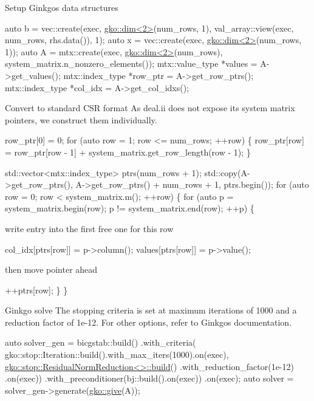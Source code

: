 Setup Ginkgo\textquotesingle{}s data structures


\begin{DoxyCode}
\textcolor{keyword}{auto} b = vec::create(exec, \hyperlink{structgko_1_1dim}{gko::dim<2>}(num\_rows, 1),
                     val\_array::view(exec, num\_rows, rhs.data()), 1);
\textcolor{keyword}{auto} x = vec::create(exec, \hyperlink{structgko_1_1dim}{gko::dim<2>}(num\_rows, 1));
\textcolor{keyword}{auto} A = mtx::create(exec, \hyperlink{structgko_1_1dim}{gko::dim<2>}(num\_rows),
                     system\_matrix.n\_nonzero\_elements());
mtx::value\_type *values = A->get\_values();
mtx::index\_type *row\_ptr = A->get\_row\_ptrs();
mtx::index\_type *col\_idx = A->get\_col\_idxs();
\end{DoxyCode}


Convert to standard C\+SR format As deal.\+ii does not expose its system matrix pointers, we construct them individually.


\begin{DoxyCode}
row\_ptr[0] = 0;
\textcolor{keywordflow}{for} (\textcolor{keyword}{auto} row = 1; row <= num\_rows; ++row) \{
    row\_ptr[row] = row\_ptr[row - 1] + system\_matrix.get\_row\_length(row - 1);
\}

std::vector<mtx::index\_type> ptrs(num\_rows + 1);
std::copy(A->get\_row\_ptrs(), A->get\_row\_ptrs() + num\_rows + 1,
          ptrs.begin());
\textcolor{keywordflow}{for} (\textcolor{keyword}{auto} row = 0; row < system\_matrix.m(); ++row) \{
    \textcolor{keywordflow}{for} (\textcolor{keyword}{auto} p = system\_matrix.begin(row); p != system\_matrix.end(row);
         ++p) \{
\end{DoxyCode}


write entry into the first free one for this row


\begin{DoxyCode}
col\_idx[ptrs[row]] = p->column();
values[ptrs[row]] = p->value();
\end{DoxyCode}


then move pointer ahead


\begin{DoxyCode}
        ++ptrs[row];
    \}
\}
\end{DoxyCode}


Ginkgo solve The stopping criteria is set at maximum iterations of 1000 and a reduction factor of 1e-\/12. For other options, refer to Ginkgo\textquotesingle{}s documentation.


\begin{DoxyCode}
\textcolor{keyword}{auto} solver\_gen =
    bicgstab::build()
        .with\_criteria(
            gko::stop::Iteration::build().with\_max\_iters(1000).on(exec),
            \hyperlink{classgko_1_1stop_1_1ResidualNormReduction}{gko::stop::ResidualNormReduction<>::build}()
                .with\_reduction\_factor(1e-12)
                .on(exec))
        .with\_preconditioner(bj::build().on(exec))
        .on(exec);
\textcolor{keyword}{auto} solver = solver\_gen->generate(\hyperlink{namespacegko_acbd3fd6d07e498892881e8e2ab0b4167}{gko::give}(A));
\end{DoxyCode}


